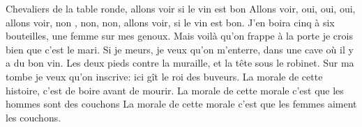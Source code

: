 \beginverse
Chevaliers de la table ronde,
allons voir si le vin est bon
\endverse
\beginchorus
Allons voir, oui, oui, oui,
allons voir, non , non, non,
allons voir, si le vin est bon.
\endchorus
\beginverse
J’en boira cinq à six bouteilles,
une femme sur mes genoux.
Mais voilà qu’on frappe à la porte
je crois bien que c’est le mari.
\endverse
\beginverse
Si je meurs, je veux qu’on m’enterre,
dans une cave où il y a du bon vin.
Les deux pieds contre la muraille,
et la tête sous le robinet.
\endverse
\beginverse
Sur ma tombe je veux qu’on inscrive:
ici gît le roi des buveurs.
La morale de cette histoire,
c’est de boire avant de mourir.
\endverse
\beginverse
La morale de cette morale
c’est que les hommes sont des couchons
La morale de cette morale
c’est que les femmes aiment les couchons.
\endverse
\endsong